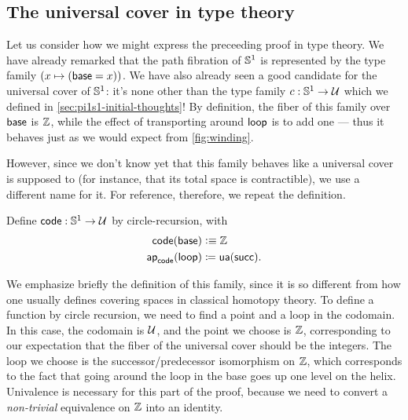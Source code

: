 %

\subsection{The universal cover in type theory}
\label{sec:pi1s1-universal-cover}

%
%
%

Let us consider how we might express the preceeding proof in type theory.
We have already remarked that the path fibration of $\mathbb{S}^1$ is represented by the type family $(x\mapsto (\mathsf{base}=x))$.
We have also already seen a good candidate for the universal cover of $\mathbb{S}^1$: it's none other than the type family $c:\mathbb{S}^1\to\mathcal{U}$ which we defined in \autoref{sec:pi1s1-initial-thoughts}!
By definition, the fiber of this family over $\mathsf{base}$ is $\mathbb{Z}$, while the effect of transporting around $\mathsf{loop}$ is to add one --- thus it behaves just as we would expect from \autoref{fig:winding}.

However, since we don't know yet that this family behaves like a universal cover is supposed to (for instance, that its total space is contractible), we use a different name for it.
For reference, therefore, we repeat the definition.

\begin{defn} \label{S1-universal-cover}
  Define $\mathsf{code} : \mathbb{S} ^1 \to \mathcal{U}$ by circle-recursion, with 
  \begin{align*}
    \mathsf{code}(\mathsf{base}) &\vcentcolon\equiv \mathbb{Z} \\
    \mathsf{ap}_{\mathsf{code}}({\mathsf{loop}}) &\coloneqq \mathsf{ua}(\mathsf{succ}).
  \end{align*}
\end{defn}

We emphasize briefly the definition of this family, since it is so different from how one usually defines covering spaces in classical homotopy theory.
To define a function by circle recursion, we need to find a point and a
loop in the codomain.  In this case, the codomain is $\mathcal{U}$, and the point
we choose is $\mathbb{Z}$, corresponding to our expectation that the
fiber of the universal cover should be the integers.  The loop we choose
is the successor/predecessor
%
%
isomorphism on $\mathbb{Z}$, which
corresponds to the fact that going around the loop in the base goes up
one level on the helix.  Univalence is necessary for this part of the
proof, because we need to convert a \emph{non-trivial} equivalence on $\mathbb{Z}$ into an identity.  

